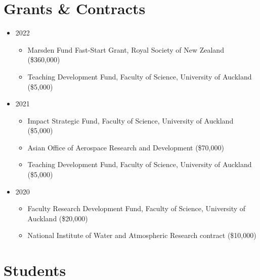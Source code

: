 \documentclass[10pt,a4paper]{moderncv}
\begin{document}

\section{Grants \& Contracts}

\vspace{6pt}
\begin{itemize}
\item 2022
  \begin{itemize}
  \item Marsden Fund Fast-Start Grant, Royal Society of New Zealand (\$360,000)
  \item Teaching Development Fund, Faculty of Science, University of Auckland (\$5,000)
  \end{itemize}
\item 2021
  \begin{itemize}
  \item Impact Strategic Fund, Faculty of Science, University of Auckland (\$5,000)
  \item Asian Office of Aerospace Research and Development (\$70,000)
  \item Teaching Development Fund, Faculty of Science, University of Auckland (\$5,000)
  \end{itemize}
\item 2020
  \begin{itemize}
  \item Faculty Research Development Fund, Faculty of Science, University of Auckland (\$20,000)
  \item National Institute of Water and Atmospheric Research contract (\$10,000)
  \end{itemize}
\end{itemize}
\newpage
\section{Students}

\vspace{6pt}
\end{document}
